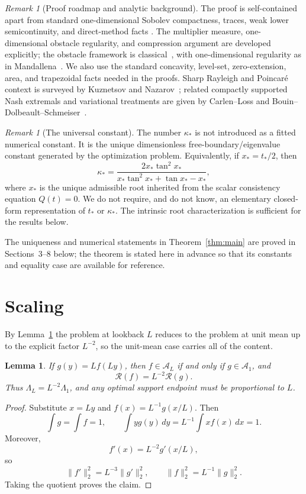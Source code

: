 \documentclass[11pt]{amsart}
\newtheorem{lemma}[theorem]{Lemma}
\theoremstyle{definition}
\theoremstyle{remark}
\newtheorem{remark}[theorem]{Remark}
\newcommand{\A}{\mathcal A}
\newcommand{\Rcal}{\mathcal R}
\begin{document}
\begin{remark}[Proof roadmap and analytic background]\label{rem:standard-inputs}
The proof is self-contained apart from standard one-dimensional Sobolev
compactness, traces, weak lower semicontinuity, and direct-method facts
\cite{Brezis,LiebLoss}. The multiplier measure, one-dimensional obstacle
regularity, and compression argument are developed explicitly; the obstacle
framework is classical~\cite{KinderlehrerStampacchia,Friedman}, with
one-dimensional regularity as in Mandallena~\cite{Mandallena}. We also use the
standard concavity, level-set, zero-extension, area, and trapezoidal facts
needed in the proofs. Sharp Rayleigh and Poincaré context is surveyed by
Kuznetsov and Nazarov~\cite{KuznetsovNazarov}; related compactly supported Nash
extremals and variational treatments are given by Carlen--Loss
\cite{CarlenLoss} and Bouin--Dolbeault--Schmeiser~\cite{BouinDolbeaultSchmeiser}.
\end{remark}

\begin{remark}[The universal constant]
The number $\kappa_*$ is not introduced as a fitted numerical constant. It
is the unique dimensionless free-boundary/\allowbreak eigenvalue constant generated by the
optimization problem. Equivalently, if $x_*=t_*/2$, then
\[
 \kappa_*=
 \frac{2x_*\tan^2 x_*}
 {x_*\tan^2 x_*+\tan x_*-x_*},
\]
where $x_*$ is the unique admissible root inherited from the scalar
consistency equation $Q(t)=0$. We do not require, and do not know, an elementary closed-form representation of
$t_*$ or $\kappa_*$. The intrinsic root characterization is sufficient for the
results below.
\end{remark}

The uniqueness and numerical statements in Theorem~\ref{thm:main} are proved
in Sections~3--8 below; the theorem is stated here in advance so that its
constants and equality case are available for reference.

\section{Scaling}
By Lemma~\ref{lem:scaling} the problem at lookback $L$ reduces to the
problem at unit mean up to the explicit factor $L^{-2}$, so the unit-mean case
carries all of the content.
\begin{lemma}\label{lem:scaling}
If $g(y)=Lf(Ly)$, then $f\in\A_L$ if and only if $g\in\A_1$, and
\[
 \Rcal(f)=L^{-2}\Rcal(g).
\]
Thus $\Lambda_L=L^{-2}\Lambda_1$, and any optimal support endpoint must be proportional to $L$.
\end{lemma}
\begin{proof}
Substitute $x=Ly$ and $f(x)=L^{-1}g(x/L)$. Then
\[
 \int g=\int f=1,
 \qquad
 \int yg(y)\,dy=L^{-1}\int xf(x)\,dx=1.
\]
Moreover,
\[
 f'(x)=L^{-2}g'(x/L),
\]
so
\[
 \|f'\|_2^2=L^{-3}\|g'\|_2^2,
 \qquad
 \|f\|_2^2=L^{-1}\|g\|_2^2.
\]
Taking the quotient proves the claim.
\end{proof}
\end{document}
